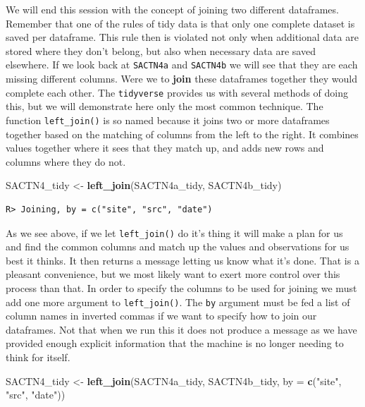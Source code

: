 \documentclass[
]{book}
\newenvironment{Shaded}{\begin{snugshade}}{\end{snugshade}}
\newcommand{\DataTypeTok}[1]{\textcolor[rgb]{0.13,0.29,0.53}{#1}}
\newcommand{\KeywordTok}[1]{\textcolor[rgb]{0.13,0.29,0.53}{\textbf{#1}}}
\newcommand{\NormalTok}[1]{#1}
\newcommand{\StringTok}[1]{\textcolor[rgb]{0.31,0.60,0.02}{#1}}
\begin{document}
We will end this session with the concept of joining two different dataframes. Remember that one of the rules of tidy data is that only one complete dataset is saved per dataframe. This rule then is violated not only when additional data are stored where they don't belong, but also when necessary data are saved elsewhere. If we look back at \texttt{SACTN4a} and \texttt{SACTN4b} we will see that they are each missing different columns. Were we to \textbf{join} these dataframes together they would complete each other. The \texttt{tidyverse} provides us with several methods of doing this, but we will demonstrate here only the most common technique. The function \texttt{left\_join()} is so named because it joins two or more dataframes together based on the matching of columns from the left to the right. It combines values together where it sees that they match up, and adds new rows and columns where they do not.

\begin{Shaded}
\begin{Highlighting}[]
\NormalTok{SACTN4\_tidy <{-}}\StringTok{ }\KeywordTok{left\_join}\NormalTok{(SACTN4a\_tidy, SACTN4b\_tidy)}
\end{Highlighting}
\end{Shaded}

\begin{verbatim}
R> Joining, by = c("site", "src", "date")
\end{verbatim}

As we see above, if we let \texttt{left\_join()} do it's thing it will make a plan for us and find the common columns and match up the values and observations for us best it thinks. It then returns a message letting us know what it's done. That is a pleasant convenience, but we most likely want to exert more control over this process than that. In order to specify the columns to be used for joining we must add one more argument to \texttt{left\_join()}. The \texttt{by} argument must be fed a list of column names in inverted commas if we want to specify how to join our dataframes. Not that when we run this it does not produce a message as we have provided enough explicit information that the machine is no longer needing to think for itself.

\begin{Shaded}
\begin{Highlighting}[]
\NormalTok{SACTN4\_tidy <{-}}\StringTok{ }\KeywordTok{left\_join}\NormalTok{(SACTN4a\_tidy, SACTN4b\_tidy, }\DataTypeTok{by =} \KeywordTok{c}\NormalTok{(}\StringTok{"site"}\NormalTok{, }\StringTok{"src"}\NormalTok{, }\StringTok{"date"}\NormalTok{))}
\end{Highlighting}
\end{Shaded}
\end{document}
